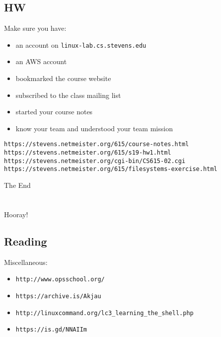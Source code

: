 \documentclass[xga]{xdvislides}
\begin{document}
\subsection{HW}
Make sure you have:
\begin{itemize}
	\item an account on {\tt linux-lab.cs.stevens.edu}
	\item an AWS account
	\item bookmarked the course website
	\item subscribed to the class mailing list
	\item started your course notes
	\item know your team and understood your team mission
\end{itemize}

\vspace*{\fill}
{\tt https://stevens.netmeister.org/615/course-notes.html} \\
{\tt https://stevens.netmeister.org/615/s19-hw1.html} \\
{\tt https://stevens.netmeister.org/cgi-bin/CS615-02.cgi} \\
{\tt https://stevens.netmeister.org/615/filesystems-exercise.html} \\
\vspace*{\fill}

\newpage
\vspace*{\fill}
\begin{center}
    \Hugesize
        The End \\ [1em]
    \hspace*{5mm}
    \blueline\\
    \hspace*{5mm}\\
        Hooray!
\end{center}
\vspace*{\fill}

\subsection{Reading}
Miscellaneous:
\begin{itemize}
	\item \verb+http://www.opsschool.org/+
	\item \verb+https://archive.is/Akjau+
	\item \verb+http://linuxcommand.org/lc3_learning_the_shell.php+
	\item \verb+https://is.gd/NNAIIm+
\end{itemize}
\end{document}
